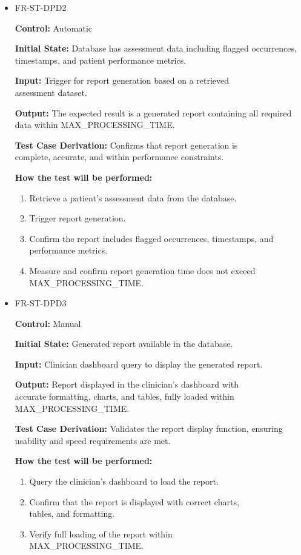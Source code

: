 \documentclass[12pt, titlepage]{article}
\begin{document}
\begin{itemize}
  \item FR-ST-DPD2
  \begin{mdframed}[linewidth=0.5mm]
      \textbf{Control:} Automatic \par
      \textbf{Initial State:} Database has assessment data including flagged occurrences, timestamps, and patient performance metrics. \par
      \textbf{Input:} Trigger for report generation based on a retrieved \\assessment dataset. \par
      \textbf{Output:} The expected result is a generated report containing all required data within MAX\_PROCESSING\_TIME. \par
      \textbf{Test Case Derivation:} Confirms that report generation is \\complete, accurate, and within performance constraints. \par
      \textbf{How the test will be performed:}
      \begin{enumerate}[noitemsep]
        \item Retrieve a patient’s assessment data from the database. 
        \item Trigger report generation. 
        \item Confirm the report includes flagged occurrences, timestamps, and performance metrics. 
        \item Measure and confirm report generation time does not exceed MAX\_PROCESSING\_TIME.
      \end{enumerate}
  \end{mdframed}

  \item FR-ST-DPD3
  \begin{mdframed}[linewidth=0.5mm]
      \textbf{Control:} Manual \par
      \textbf{Initial State:} Generated report available in the database. \par
      \textbf{Input:} Clinician dashboard query to display the generated report. \par
      \textbf{Output:} Report displayed in the clinician’s dashboard with \\accurate formatting, charts, and tables, fully loaded within \\MAX\_PROCESSING\_TIME. \par
      \textbf{Test Case Derivation:} Validates the report display function, ensuring usability and speed requirements are met. \par
      \textbf{How the test will be performed:}
      \begin{enumerate}[noitemsep]
        \item Query the clinician’s dashboard to load the report. 
        \item Confirm that the report is displayed with correct charts, \\tables, and formatting. 
        \item Verify full loading of the report within \\MAX\_PROCESSING\_TIME.
      \end{enumerate}
  \end{mdframed}


\end{itemize}
\end{document}
